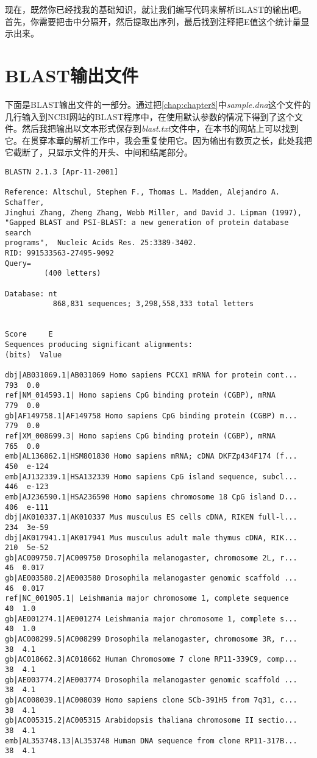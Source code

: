 现在，既然你已经找我的基础知识，就让我们编写代码来解析BLAST的输出吧。首先，你需要把击中分隔开，然后提取出序列，最后找到注释把E值这个统计量显示出来。

\section{BLAST输出文件}
\label{sect:section12.3}
下面是BLAST输出文件的一部分。通过把\autoref{chap:chapter8}中\textit{sample.dna}这个文件的几行输入到NCBI网站的BLAST程序中，在使用默认参数的情况下得到了这个文件。然后我把输出以文本形式保存到\textit{blast.txt}文件中，在本书的网站上可以找到它。在贯穿本章的解析工作中，我会重复使用它。因为输出有数页之长，此处我把它截断了，只显示文件的开头、中间和结尾部分。

\begin{lstlisting}
BLASTN 2.1.3 [Apr-11-2001]

Reference: Altschul, Stephen F., Thomas L. Madden, Alejandro A. Schaffer,
Jinghui Zhang, Zheng Zhang, Webb Miller, and David J. Lipman (1997),
"Gapped BLAST and PSI-BLAST: a new generation of protein database search
programs",  Nucleic Acids Res. 25:3389-3402.
RID: 991533563-27495-9092
Query=
         (400 letters)

Database: nt
           868,831 sequences; 3,298,558,333 total letters

                                                                   Score     E
Sequences producing significant alignments:                        (bits)  Value

dbj|AB031069.1|AB031069 Homo sapiens PCCX1 mRNA for protein cont...   793  0.0
ref|NM_014593.1| Homo sapiens CpG binding protein (CGBP), mRNA        779  0.0
gb|AF149758.1|AF149758 Homo sapiens CpG binding protein (CGBP) m...   779  0.0
ref|XM_008699.3| Homo sapiens CpG binding protein (CGBP), mRNA        765  0.0
emb|AL136862.1|HSM801830 Homo sapiens mRNA; cDNA DKFZp434F174 (f...   450  e-124
emb|AJ132339.1|HSA132339 Homo sapiens CpG island sequence, subcl...   446  e-123
emb|AJ236590.1|HSA236590 Homo sapiens chromosome 18 CpG island D...   406  e-111
dbj|AK010337.1|AK010337 Mus musculus ES cells cDNA, RIKEN full-l...   234  3e-59
dbj|AK017941.1|AK017941 Mus musculus adult male thymus cDNA, RIK...   210  5e-52
gb|AC009750.7|AC009750 Drosophila melanogaster, chromosome 2L, r...    46  0.017
gb|AE003580.2|AE003580 Drosophila melanogaster genomic scaffold ...    46  0.017
ref|NC_001905.1| Leishmania major chromosome 1, complete sequence      40  1.0
gb|AE001274.1|AE001274 Leishmania major chromosome 1, complete s...    40  1.0
gb|AC008299.5|AC008299 Drosophila melanogaster, chromosome 3R, r...    38  4.1
gb|AC018662.3|AC018662 Human Chromosome 7 clone RP11-339C9, comp...    38  4.1
gb|AE003774.2|AE003774 Drosophila melanogaster genomic scaffold ...    38  4.1
gb|AC008039.1|AC008039 Homo sapiens clone SCb-391H5 from 7q31, c...    38  4.1
gb|AC005315.2|AC005315 Arabidopsis thaliana chromosome II sectio...    38  4.1
emb|AL353748.13|AL353748 Human DNA sequence from clone RP11-317B...    38  4.1


\end{lstlisting}
